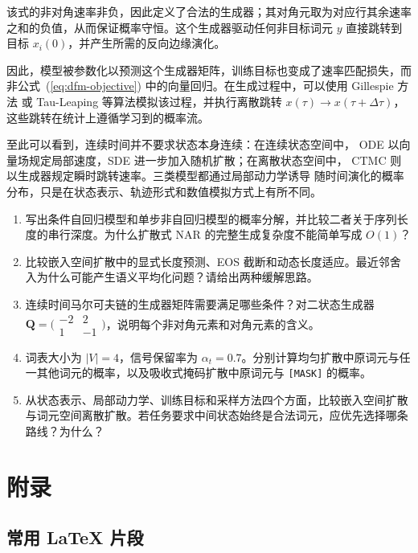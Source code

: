 \documentclass[UTF8,a4paper,zihao=-4,oneside,openany]{ctexbook}
\begin{document}
\noindent 该式的非对角速率非负，因此定义了合法的生成器；其对角元取为对应行其余速率之和的负值，从而保证概率守恒。这个生成器驱动任何非目标词元 $y$ 直接跳转到目标 $x_i(0)$，并产生所需的反向边缘演化。

因此，模型被参数化以预测这个生成器矩阵，训练目标也变成了速率匹配损失，而非公式~(\ref{eq:dfm-objective}) 中的向量回归。在生成过程中，可以使用 Gillespie 方法 \citep{gillespie:1977exact} 或 Tau-Leaping \citep{gillespie:2001approximate} 等算法模拟该过程，并执行离散跳转 $x(\tau) \to x(\tau+\Delta \tau)$，这些跳转在统计上遵循学习到的概率流。

至此可以看到，连续时间并不要求状态本身连续：在连续状态空间中，
ODE 以向量场规定局部速度，SDE 进一步加入随机扩散；在离散状态空间中，
CTMC 则以生成器规定瞬时跳转速率。三类模型都通过局部动力学诱导
随时间演化的概率分布，只是在状态表示、轨迹形式和数值模拟方式上有所不同。

\begin{exercisebox}
  \begin{enumerate}
    \item 写出条件自回归模型和单步非自回归模型的概率分解，并比较二者关于序列长度的串行深度。为什么扩散式 NAR 的完整生成复杂度不能简单写成 \(O(1)\)？
    \item 比较嵌入空间扩散中的显式长度预测、EOS 截断和动态长度适应。最近邻舍入为什么可能产生语义平均化问题？请给出两种缓解思路。
    \item 连续时间马尔可夫链的生成器矩阵需要满足哪些条件？对二状态生成器 \(\boldsymbol Q=\bigl(\begin{smallmatrix}-2&2\\1&-1\end{smallmatrix}\bigr)\)，说明每个非对角元素和对角元素的含义。
    \item 词表大小为 \(|V|=4\)，信号保留率为 \(\alpha_t=0.7\)。分别计算均匀扩散中原词元与任一其他词元的概率，以及吸收式掩码扩散中原词元与 \texttt{[MASK]} 的概率。
    \item 从状态表示、局部动力学、训练目标和采样方法四个方面，比较嵌入空间扩散与词元空间离散扩散。若任务要求中间状态始终是合法词元，应优先选择哪条路线？为什么？
  \end{enumerate}
\end{exercisebox}

\appendix
\chapter{附录}

\section{常用 LaTeX 片段}
\end{document}
